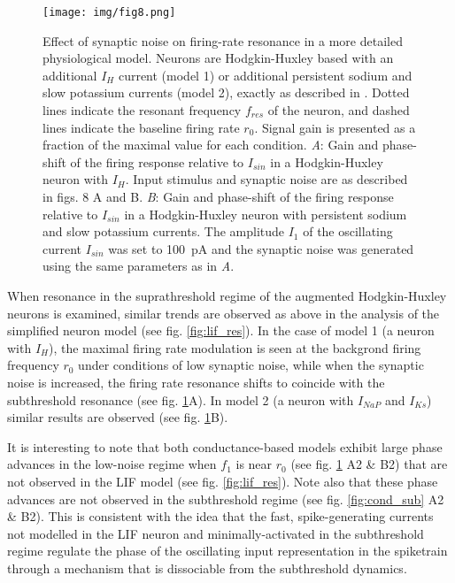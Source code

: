 \documentclass[12pt]{article}
\begin{document}
\begin{figure}
    \texttt{[image: img/fig8.png]}
    \caption[Noise-dependent firing resonance in conductance-based models]{
        Effect of synaptic noise on firing-rate resonance in a more detailed physiological model.
        Neurons are Hodgkin-Huxley based with an additional $I_H$ current (model 1) or additional persistent sodium and slow potassium currents (model 2), exactly as described in \cite{richardson_subthreshold_2003}.
        Dotted lines indicate the resonant frequency $f_{res}$ of the neuron, and dashed lines indicate the baseline firing rate $r_0$.
        Signal gain is presented as a fraction of the maximal value for each condition.
        \textit{A}: Gain and phase-shift of the firing response relative to $I_{sin}$ in a Hodgkin-Huxley neuron with $I_H$.
        Input stimulus and synaptic noise are as described in \cite{richardson_subthreshold_2003} figs. 8 A and B.
        \textit{B}: Gain and phase-shift of the firing response relative to $I_{sin}$ in a Hodgkin-Huxley neuron with persistent sodium and slow potassium currents.
        The amplitude $I_1$ of the oscillating current $I_{sin}$ was set to \SI{100}{\pico\ampere} and the synaptic noise was generated using the same parameters as in \textit{A}.
        }
    \label{fig:cond_f}
\end{figure}

When resonance in the suprathreshold regime of the augmented Hodgkin-Huxley neurons is examined, similar trends are observed as above in the analysis of the simplified neuron model (see fig. \ref{fig:lif_res}).
In the case of model 1 (a neuron with $I_H$), the maximal firing rate modulation is seen at the backgrond firing frequency $r_0$ under conditions of low synaptic noise, while when the synaptic noise is increased, the firing rate resonance shifts to coincide with the subthreshold resonance (see fig. \ref{fig:cond_f}A).
In model 2 (a neuron with $I_{NaP}$ and $I_{Ks}$) similar results are observed (see fig. \ref{fig:cond_f}B).

It is interesting to note that both conductance-based models exhibit large phase advances in the low-noise regime when $f_1$ is near $r_0$ (see fig. \ref{fig:cond_f} A2 \& B2) that are not observed in the LIF model (see fig. \ref{fig:lif_res}).
Note also that these phase advances are not observed in the subthreshold regime (see fig. \ref{fig:cond_sub} A2 \& B2).
This is consistent with the idea that the fast, spike-generating currents not modelled in the LIF neuron and minimally-activated in the subthreshold regime regulate the phase of the oscillating input representation in the spiketrain through a mechanism that is dissociable from the subthreshold dynamics.
\end{document}

